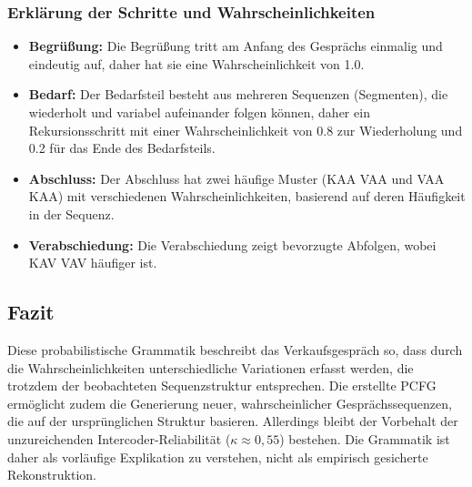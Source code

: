 \documentclass[
]{article}
\begin{document}
\subsubsection{Erklärung der Schritte und Wahrscheinlichkeiten}\label{erklaerung-der-schritte-und-wahrscheinlichkeiten}

\begin{itemize}
\item \textbf{Begrüßung:} Die Begrüßung tritt am Anfang des Gesprächs einmalig und eindeutig auf, daher hat sie eine Wahrscheinlichkeit von 1.0.
\item \textbf{Bedarf:} Der Bedarfsteil besteht aus mehreren Sequenzen (Segmenten), die wiederholt und variabel aufeinander folgen können, daher ein Rekursionsschritt mit einer Wahrscheinlichkeit von 0.8 zur Wiederholung und 0.2 für das Ende des Bedarfsteils.
\item \textbf{Abschluss:} Der Abschluss hat zwei häufige Muster (KAA VAA und VAA KAA) mit verschiedenen Wahrscheinlichkeiten, basierend auf deren Häufigkeit in der Sequenz.
\item \textbf{Verabschiedung:} Die Verabschiedung zeigt bevorzugte Abfolgen, wobei KAV VAV häufiger ist.
\end{itemize}

\subsection{Fazit}\label{fazit}

Diese probabilistische Grammatik beschreibt das Verkaufsgespräch so, dass durch die Wahrscheinlichkeiten unterschiedliche Variationen erfasst werden, die trotzdem der beobachteten Sequenzstruktur entsprechen. Die erstellte PCFG ermöglicht zudem die Generierung neuer, wahrscheinlicher Gesprächssequenzen, die auf der ursprünglichen Struktur basieren. Allerdings bleibt der Vorbehalt der unzureichenden Intercoder-Reliabilität (\(\kappa \approx 0,55\)) bestehen. Die Grammatik ist daher als vorläufige Explikation zu verstehen, nicht als empirisch gesicherte Rekonstruktion.
\end{document}
